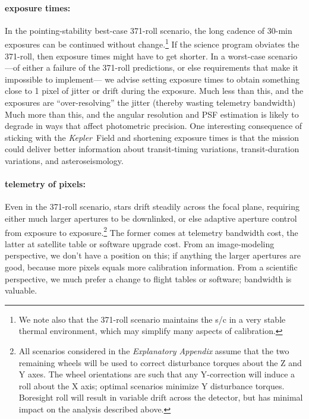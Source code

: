 \documentclass[letterpaper,12pt,whitepaper]{haastex}
\newcommand{\observatory}[1]{\textsl{#1}}
\newcommand{\Kepler}{\observatory{Kepler}}
\begin{document}
\paragraph{exposure times:}
In the pointing-stability best-case 371-roll scenario,
  the long cadence of 30-min exposures can be continued without change.\footnote{We note also that the 371-roll scenario maintains the s/c in a very stable thermal environment, which may simplify many aspects of calibration.}
If the science program obviates the 371-roll,
  then exposure times might have to get shorter.
In a worst-case scenario%
  ---of either a failure of the 371-roll predictions,
  or else requirements that make it impossible to implement---%
  we advise setting exposure times to obtain something close to 1 pixel
  of jitter or drift during the exposure.
Much less than this, and the exposures are ``over-resolving'' the jitter
  (thereby wasting telemetry bandwidth)
Much more than this, and the angular resolution and PSF estimation is
  likely to degrade in ways that affect photometric precision.
One interesting consequence of sticking with the \Kepler~Field and shortening
  exposure times is that the mission could deliver better information
  about transit-timing variations, transit-duration variations, and asteroseismology.

\paragraph{telemetry of pixels:}
Even in the 371-roll scenario, stars drift steadily across the focal plane,
  requiring either much larger apertures to be downlinked,
  or else adaptive aperture control from exposure to exposure.\footnote{All scenarios considered in the \textit{Explanatory Appendix} assume that the two remaining wheels will be used to correct disturbance torques about the Z and Y axes.  The wheel orientations are such that any Y-correction will induce a roll about the X axis; optimal scenarios minimize Y disturbance torques.  Boresight roll will result in variable drift across the detector, but has minimal impact on the analysis described above.}
The former comes at telemetry bandwidth cost,
  the latter at satellite table or software upgrade cost.
From an image-modeling perspective, we don't have a position on this;
  if anything the larger apertures are good,
  because more pixels equals more calibration information.
From a scientific perspective, we much prefer a change to flight tables or software;
  bandwidth is valuable.
\end{document}
